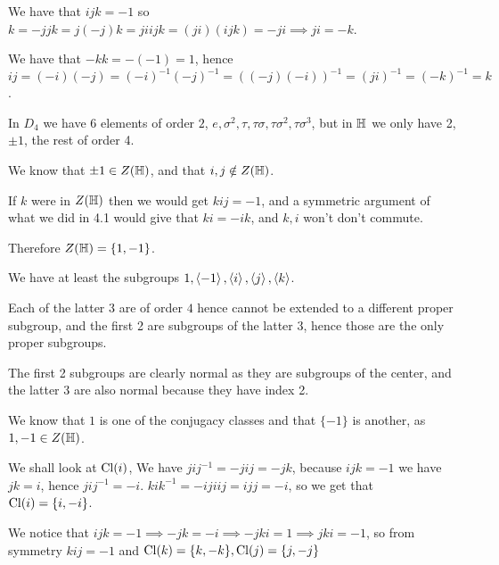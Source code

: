 \begin{cExercise}
	\begin{cPart}
		We have that $ijk=-1$ so $k=-jjk=j(-j)k=jiijk=(ji)(ijk)=-ji\implies ji=-k$.
		
		We have that $-kk=-(-1)=1$, hence $ij=(-i)(-j)=(-i)^{-1}(-j)^{-1}=((-j)(-i))^{-1}=(ji)^{-1}=(-k)^{-1}=k$.
	\end{cPart}
	\begin{cPart}
		In $D_4$ we have 6 elements of order $2$, $e,\sigma^2,\tau,\tau\sigma,\tau\sigma^2,\tau\sigma^3$, but in $\mathbb H$ we only have 2, $\pm1$, the rest of order 4.
	\end{cPart}
	\begin{cPart}
		We know that $\pm 1\in Z(\mathbb H)$, and that $i,j\notin Z(\mathbb H)$.
		
		If $k$ were in $Z(\mathbb H)$ then we would get $kij=-1$, and a symmetric argument of what we did in 4.1 would give that $ki=-ik$, and $k,i$ won't don't commute.
		
		Therefore $Z(\mathbb H)=\{1,-1\}$.
	\end{cPart}
	\begin{cPart}
		We have at least the subgroups $1,\left\langle-1\right\rangle,\left\langle i\right\rangle,\left\langle j\right\rangle,\left\langle k\right\rangle$.
		
		Each of the latter 3 are of order $4$ hence cannot be extended to a different proper subgroup, and the first 2 are subgroups of the latter 3, hence those are the only proper subgroups.
		
		The first 2 subgroups are clearly normal as they are subgroups of the center, and the latter 3 are also normal because they have index 2.
	\end{cPart}
	\begin{cPart}
		We know that $1$ is one of the conjugacy classes and that $\{-1\}$ is another, as $1,-1\in Z(\mathbb H)$.
		
		We shall look at $\operatorname{Cl}(i)$, We have $jij^{-1}=-jij=-jk$, because $ijk=-1$ we have $jk=i$, hence $jij^{-1}=-i$. $kik^{-1}=-ijiij=ijj=-i$, so we get that $\operatorname{Cl}(i)=\{i,-i\}$.
		
		We notice that $ijk=-1\implies -jk=-i\implies -jki=1\implies jki=-1$, so from symmetry $kij=-1$ and $\operatorname{Cl}(k)=\{k,-k\},\operatorname{Cl}(j)=\{j,-j\}$
	\end{cPart}
\end{cExercise}
